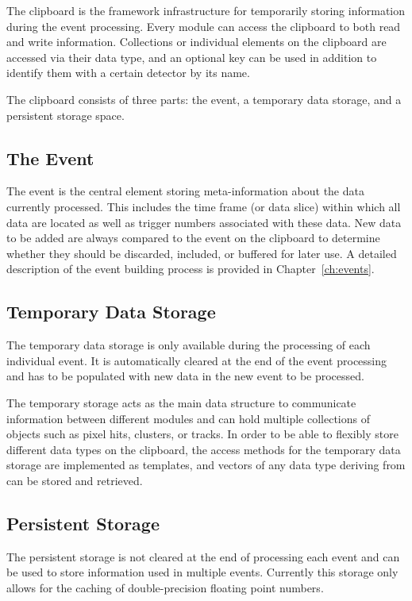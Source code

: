The clipboard is the framework infrastructure for temporarily storing information during the event processing.
Every module can access the clipboard to both read and write information.
Collections or individual elements on the clipboard are accessed via their data type, and an optional key can be used in addition to identify them with a certain detector by its name.

The clipboard consists of three parts: the event, a temporary data storage, and a persistent storage space.

\subsection{The Event}

The event is the central element storing meta-information about the data currently processed.
This includes the time frame (or data slice) within which all data are located as well as trigger numbers associated with these data.
New data to be added are always compared to the event on the clipboard to determine whether they should be discarded, included, or buffered for later use.
A detailed description of the event building process is provided in Chapter~\ref{ch:events}.

\subsection{Temporary Data Storage}
The temporary data storage is only available during the processing of each individual event.
It is automatically cleared at the end of the event processing and has to be populated with new data in the new event to be processed.

The temporary storage acts as the main data structure to communicate information between different modules and can hold multiple collections of \corry objects such as pixel hits, clusters, or tracks.
In order to be able to flexibly store different data types on the clipboard, the access methods for the temporary data storage are implemented as templates, and vectors of any data type deriving from  can be stored and retrieved.

\subsection{Persistent Storage}
The persistent storage is not cleared at the end of processing each event and can be used to store information used in multiple events.
Currently this storage only allows for the caching of double-precision floating point numbers.


